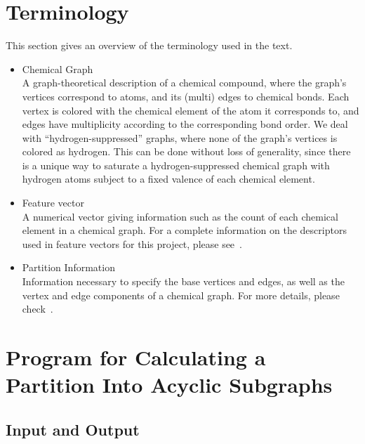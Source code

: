 \documentclass[11pt,titlepage,dvipdfmx,twoside]{article}
\begin{document}
\section{Terminology}
\label{sec:term}

This section gives an overview of the terminology used in the text.
%
\begin{itemize}
%
\item Chemical Graph\\
A graph-theoretical description of a chemical compound, 
where the graph's vertices correspond to atoms, and
its (multi) edges to chemical bonds.
Each vertex is colored with the chemical element of the atom it corresponds to,
and edges have multiplicity according to the corresponding bond order.
We deal with ``hydrogen-suppressed'' graphs, 
where none of the graph's vertices is colored as hydrogen.
This can be done without loss of generality,
since there is a unique way to saturate a hydrogen-suppressed chemical graph 
with hydrogen atoms subject to a fixed valence of each chemical element.


\item Feature vector\\
A numerical vector giving information such as the count of
each chemical element in a chemical graph.
For a complete information on the descriptors used in feature vectors for
this project, please see~\cite{branch}.



\item Partition Information\\
Information necessary to specify the base vertices and edges, as well as the vertex and edge components
of a chemical graph.
For more details, please check~\cite{branch}.



\end{itemize}

\section{Program for Calculating a Partition Into Acyclic Subgraphs}
\label{sec: partition}

\subsection{Input and Output}
\label{sec:InOut_p}
\end{document}
